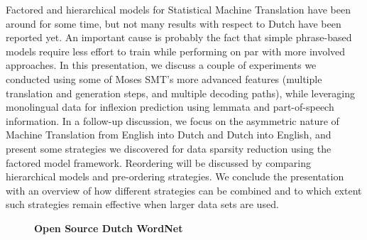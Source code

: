 \documentclass[10pt, a4paper, twopage, headinclude, footinclude, BCOR5mm]{scrartcl}
\begin{document}
\noindent
Factored and hierarchical models for Statistical Machine Translation have been around for some time, but not many results with respect to Dutch have been reported yet. An important cause is probably the fact that simple phrase-based models require less effort to train while performing on par with more involved approaches.  In this presentation, we discuss a couple of experiments we conducted using some of Moses SMT’s more advanced features (multiple translation and generation steps, and multiple decoding paths), while leveraging monolingual data for inflexion prediction using lemmata and part-of-speech information.  In a follow-up discussion, we focus on the asymmetric nature of Machine Translation from English into Dutch and Dutch into English, and present some strategies we discovered for data sparsity reduction using the factored model framework. Reordering will be discussed by comparing hierarchical models and pre-ordering strategies.  We conclude the presentation with an overview of how different strategies can be combined and to which extent such strategies remain effective when larger data sets are used. 


\newpage

\begin{figure}[t!]
\centering
\large\textbf{Open Source Dutch WordNet}
\vspace*{0.5cm}
\end{figure}


        \begin{table}[t!]
    \end{table}
\end{document}
